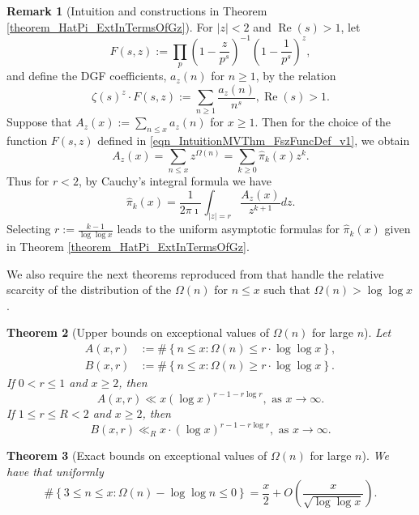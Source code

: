 \documentclass[11pt,reqno,a4letter]{article}
\numberwithin{figure}{section}
\numberwithin{table}{section}
\theoremstyle{plain}
\newtheorem{theorem}{Theorem}
\numberwithin{theorem}{section}
\theoremstyle{definition}
\newtheorem{remark}[theorem]{Remark}
\renewcommand{\Re}{\operatorname{Re}}
\begin{document}
\begin{remark}[Intuition and constructions in Theorem \ref{theorem_HatPi_ExtInTermsOfGz}] 
For $|z| < 2$ and $\Re(s) > 1$, let 
\begin{equation} 
\label{eqn_IntuitionMVThm_FszFuncDef_v1} 
F(s, z) := \prod_{p} \left(1 - \frac{z}{p^s}\right)^{-1} \left(1 - \frac{1}{p^s}\right)^{z}, 
\end{equation} 
and define the DGF coefficients, $a_z(n)$ for $n \geq 1$, by the relation 
\[
\zeta(s)^{z} \cdot F(s, z) := \sum_{n \geq 1} \frac{a_z(n)}{n^s}, \Re(s) > 1. 
\]
Suppose that $A_z(x) := \sum_{n \leq x} a_z(n)$ for $x \geq 1$. Then for the choice of the 
function $F(s, z)$ defined in \eqref{eqn_IntuitionMVThm_FszFuncDef_v1}, we obtain 
\[
A_z(x) = \sum_{n \leq x} z^{\Omega(n)} = \sum_{k \geq 0} \widehat{\pi}_k(x) z^k. 
\]
Thus for $r < 2$, by Cauchy's integral formula we have 
\[
\widehat{\pi}_k(x) = \frac{1}{2\pi\imath} \int_{|z|=r} \frac{A_z(x)}{z^{k+1}} dz. 
\]
Selecting $r := \frac{k-1}{\log\log x}$ leads to the uniform asymptotic formulas for 
$\widehat{\pi}_k(x)$ given in 
Theorem \ref{theorem_HatPi_ExtInTermsOfGz}. 
\end{remark} 

We also require the next theorems reproduced from \cite[\S 7.4]{MV} that handle the relative 
scarcity of the distribution of the $\Omega(n)$ for $n \leq x$ such that 
$\Omega(n) > \log\log x$. 

\begin{theorem}[Upper bounds on exceptional values of $\Omega(n)$ for large $n$] 
\label{theorem_MV_Thm7.20-init_stmt} 
Let 
\begin{align*} 
A(x, r) & := \#\left\{n \leq x: \Omega(n) \leq r \cdot \log\log x\right\}, \\ 
B(x, r) & := \#\left\{n \leq x: \Omega(n) \geq r \cdot \log\log x\right\}. 
\end{align*} 
If $0 < r \leq 1$ and $x \geq 2$, then 
\[
A(x, r) \ll x (\log x)^{r-1 - r\log r}, \text{ \ as\ } x \rightarrow \infty. 
\]
If $1 \leq r \leq R < 2$ and $x \geq 2$, then 
\[
B(x, r) \ll_R x \cdot (\log x)^{r-1-r \log r}, \text{ \ as\ } x \rightarrow \infty. 
\]
\end{theorem} 

\begin{theorem}[Exact bounds on exceptional values of $\Omega(n)$ for large $n$] 
\label{theorem_MV_Thm7.21-init_stmt} 
We have that uniformly 
\[
\#\left\{3 \leq n \leq x: \Omega(n) - \log\log n \leq 0\right\} = 
     \frac{x}{2} + O\left(\frac{x}{\sqrt{\log\log x}}\right). 
\]
\end{theorem} 
\end{document}
